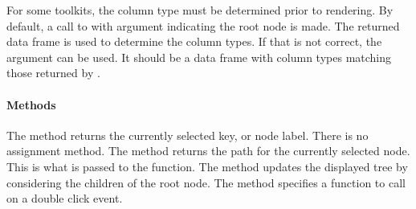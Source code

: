 For some toolkits, the column type must be determined prior to
rendering. By default, a call to  with argument
 indicating the root node is made. The returned data frame
is used to determine the column types. If that is not correct, the
argument  can be used. It should be a data
frame with column types matching those returned by .

\paragraph{Methods}
The  method returns the currently selected key,
or node label. There is no assignment method. The \method{[}{gtree}
method returns the path for the currently selected node. This is what
is passed to the  function.  The
 method updates the displayed tree by
considering the children of the root node.  The method
 specifies a function to call on
a double click event.

